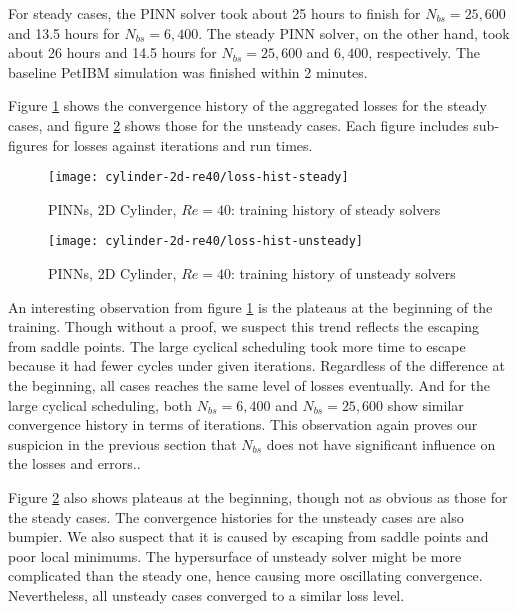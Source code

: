 
For steady cases, the PINN solver took about 25 hours to finish for $N_{bs}=25,600$ and 13.5 hours for $N_{bs}=6,400$.
The steady PINN solver, on the other hand, took about 26 hours and 14.5 hours for $N_{bs}=25,600$ and $6,400$, respectively.
The baseline PetIBM simulation was finished within 2 minutes.

Figure \ref{fig:cylinder-2d-re40-loss-hist-steady} shows the convergence history of the aggregated losses for the steady cases, and figure \ref{fig:cylinder-2d-re40-loss-hist-unsteady} shows those for the unsteady cases.
Each figure includes sub-figures for losses against iterations and run times.
\begin{figure}[hbt!]
    \texttt{[image: cylinder-2d-re40/loss-hist-steady]}
    \caption[
        PINNs, 2D Cylinder, $Re=40$: training history of steady solvers%
    ]{%
        PINNs, 2D Cylinder, $Re=40$: training history of steady solvers%
    }%
    \label{fig:cylinder-2d-re40-loss-hist-steady}
\end{figure}
\begin{figure}[hbt!]
    \texttt{[image: cylinder-2d-re40/loss-hist-unsteady]}
    \caption[
        PINNs, 2D Cylinder, $Re=40$: training history of unsteady solvers%
    ]{%
        PINNs, 2D Cylinder, $Re=40$: training history of unsteady solvers%
    }%
    \label{fig:cylinder-2d-re40-loss-hist-unsteady}
\end{figure}
An interesting observation from figure \ref{fig:cylinder-2d-re40-loss-hist-steady} is the plateaus at the beginning of the training.
Though without a proof, we suspect this trend reflects the escaping from saddle points.
The large cyclical scheduling took more time to escape because it had fewer cycles under given iterations.
Regardless of the difference at the beginning, all cases reaches the same level of losses eventually.
And for the large cyclical scheduling, both $N_{bs}=6,400$ and $N_{bs}=25,600$ show similar convergence history in terms of iterations.
This observation again proves our suspicion in the previous section that $N_{bs}$ does not have significant influence on the losses and errors..

Figure \ref{fig:cylinder-2d-re40-loss-hist-unsteady} also shows plateaus at the beginning, though not as obvious as those for the steady cases.
The convergence histories for the unsteady cases are also bumpier.
We also suspect that it is caused by escaping from saddle points and poor local minimums.
The hypersurface of unsteady solver might be more complicated than the steady one, hence causing more oscillating convergence.
Nevertheless, all unsteady cases converged to a similar loss level.

